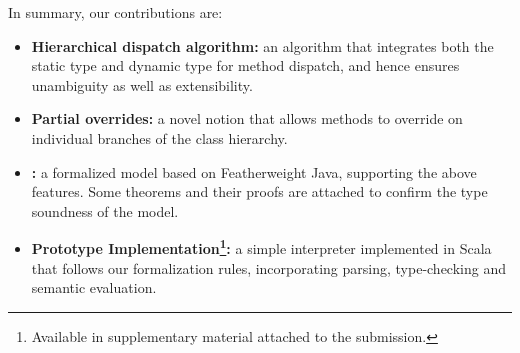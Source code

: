 In summary, our contributions are:
\begin{itemize}
	\item \textbf{Hierarchical dispatch algorithm:} an algorithm that integrates both the static type and dynamic type for method dispatch, and hence
	ensures unambiguity as well as extensibility.
	\item \textbf{Partial overrides:} a novel notion that allows
          methods to override on individual branches of the class hierarchy.
	\item \textbf{\name:} a formalized model based on Featherweight Java, supporting the above features. Some theorems and their proofs
	are attached to confirm the type soundness of the model.
	\item \textbf{Prototype Implementation\footnote{Available in supplementary material attached to the submission.}:} a simple interpreter implemented in Scala that follows our formalization rules, incorporating parsing, type-checking and semantic evaluation.
\end{itemize}

 